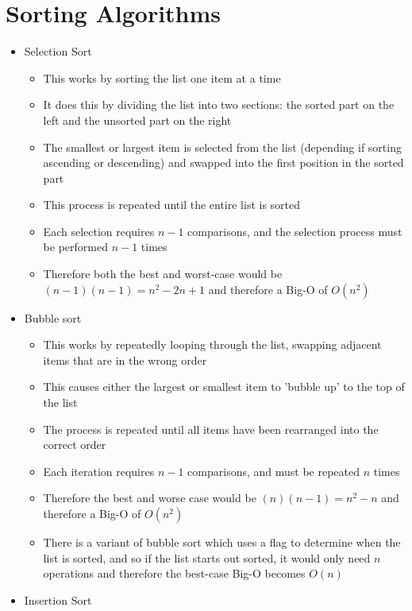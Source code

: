 \section*{Sorting Algorithms}

\begin{itemize}
  \item Selection Sort
  \begin{itemize}
    \item This works by sorting the list one item at a time
    \item It does this by dividing the list into two sections: the sorted part on the left and the unsorted part on the right
    \item The smallest or largest item is selected from the list (depending if sorting ascending or descending) and swapped into the first position in the sorted part
    \item This process is repeated until the entire list is sorted
    \item Each selection requires $n - 1$ comparisons, and the selection process must be performed $n - 1$ times
    \item Therefore both the best and worst-case would be $(n - 1)(n - 1) = n^2 - 2n + 1$ and therefore a Big-O of $O(n^2)$
  \end{itemize}
  \item Bubble sort
  \begin{itemize}
    \item This works by repeatedly looping through the list, swapping adjacent items that are in the wrong order
    \item This causes either the largest or smallest item to 'bubble up' to the top of the list
    \item The process is repeated until all items have been rearranged into the correct order
    \item Each iteration requires $n - 1$ comparisons, and must be repeated $n$ times
    \item Therefore the best and worse case would be $(n)(n - 1) = n^2 - n$ and therefore a Big-O of $O(n^2)$
    \item There is a variant of bubble sort which uses a flag to determine when the list is sorted, and so if the list starts out sorted, it would only need $n$ operations and therefore the best-case Big-O becomes $O(n)$
  \end{itemize}
  \item Insertion Sort
  \begin{itemize}

\end{itemize}
\end{itemize}
